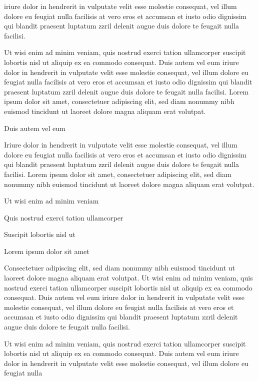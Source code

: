 \documentclass[11pt,twoside]{article}\makeatletter
\begin{document}
      iriure dolor in hendrerit in vulputate velit esse molestie consequat,
      vel illum dolore eu feugiat nulla facilisis at vero eros et accumsan
      et iusto odio dignissim qui blandit praesent luptatum zzril delenit
      augue duis dolore te feugait nulla facilisi.\par Ut wisi enim ad minim veniam, quis nostrud exerci tation
      ullamcorper suscipit lobortis nisl ut aliquip ex ea commodo
      consequat. Duis autem vel eum iriure dolor in hendrerit in vulputate
      velit esse molestie consequat, vel illum dolore eu feugiat nulla
      facilisis at vero eros et accumsan et iusto odio dignissim qui blandit
      praesent luptatum zzril delenit augue duis dolore te feugait nulla
      facilisi. Lorem ipsum dolor sit amet, consectetuer adipiscing elit,
      sed diam nonummy nibh euismod tincidunt ut laoreet dolore magna
      aliquam erat volutpat. \par Duis autem vel eum \par Iriure dolor in hendrerit in vulputate velit esse molestie
      consequat, vel illum dolore eu feugiat nulla facilisis at vero eros et
      accumsan et iusto odio dignissim qui blandit praesent luptatum zzril
      delenit augue duis dolore te feugait nulla facilisi. Lorem ipsum dolor
      sit amet, consectetuer adipiscing elit, sed diam nonummy nibh euismod
      tincidunt ut laoreet dolore magna aliquam erat volutpat. \par Ut wisi enim ad minim veniam\par Quis nostrud exerci tation ullamcorper \par Suscipit lobortis nisl ut \par Lorem ipsum dolor sit amet\par Consectetuer adipiscing elit, sed diam nonummy nibh euismod
      tincidunt ut laoreet dolore magna aliquam erat volutpat. Ut wisi enim
      ad minim veniam, quis nostrud exerci tation ullamcorper suscipit
      lobortis nisl ut aliquip ex ea commodo consequat. Duis autem vel eum
      iriure dolor in hendrerit in vulputate velit esse molestie consequat,
      vel illum dolore eu feugiat nulla facilisis at vero eros et accumsan
      et iusto odio dignissim qui blandit praesent luptatum zzril delenit
      augue duis dolore te feugait nulla facilisi.\par Ut wisi enim ad minim veniam, quis nostrud exerci tation
      ullamcorper suscipit lobortis nisl ut aliquip ex ea commodo
      consequat. Duis autem vel eum iriure dolor in hendrerit in vulputate
      velit esse molestie consequat, vel illum dolore eu feugiat nulla
\end{document}
